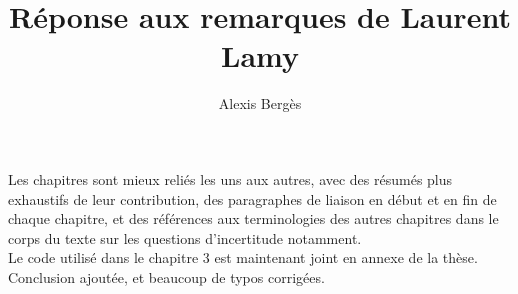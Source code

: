 \documentclass{article}
\begin{document}
\title{Réponse aux remarques de Laurent Lamy}
\author{Alexis Bergès}

\maketitle

Les chapitres sont mieux reliés les uns aux autres, avec des résumés plus exhaustifs de leur contribution, des paragraphes de liaison en début et en fin de chaque chapitre, et des références aux terminologies des autres chapitres dans le corps du texte sur les questions d'incertitude notamment.\\

Le code utilisé dans le chapitre 3 est maintenant joint en annexe de la thèse.\\

Conclusion ajoutée, et beaucoup de typos corrigées.\\
\end{document}
